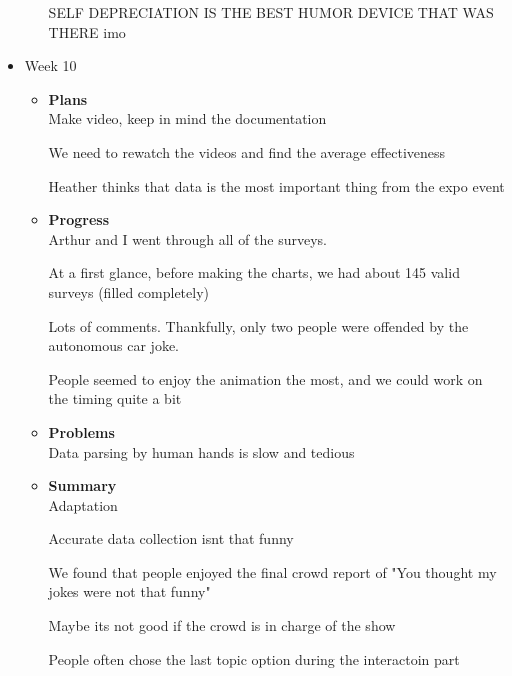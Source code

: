 \begin{itemize}
\begin{itemize}
							SELF DEPRECIATION IS THE BEST HUMOR DEVICE THAT WAS THERE imo 
			\end{itemize}

		\item{Week 10}
			\begin{itemize}
				\item \textbf{Plans} \\
					Make video, keep in mind the documentation 

					We need to rewatch the videos and find the average effectiveness 

					Heather thinks that data is the most important thing from the expo event 
				\item \textbf{Progress} \\
					Arthur and I went through all of the surveys. 

					 

					At a first glance, before making the charts, we had about 145 valid surveys (filled completely) 

					 

					Lots of comments. Thankfully, only two people were offended by the autonomous car joke. 

					 

					People seemed to enjoy the animation the most, and we could work on the timing quite a bit
				\item \textbf{Problems} \\
					Data parsing by human hands is slow and tedious 
				\item \textbf{Summary} \\
					    Adaptation 

						 Accurate data collection isnt that funny 

						 We found that people enjoyed the final crowd report of "You thought my jokes were not that funny" 

						Maybe its not good if the crowd is in charge of the show 

						People often chose the last topic option during the interactoin part 
			\end{itemize}

	\end{itemize}

	\pagebreak
